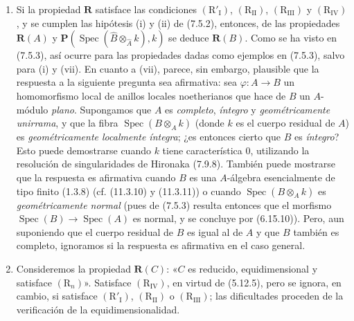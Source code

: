\begin{remarks}[7.5.4]
\begin{enumerate}
\item[(iii)] Si la propiedad $\boldsymbol R$ satisface las
condiciones $(\mathrm R'_{\mathrm I})$, $(\mathrm R_{\mathrm{II}})$,
$(\mathrm R_{\mathrm{III}})$ y $(\mathrm R_{\mathrm{IV}})$, y se
cumplen las hipótesis (i) y (ii) de (7.5.2), entonces, de las
propiedades $\boldsymbol R(A)$ y
$\boldsymbol P(\operatorname{Spec}(\widehat B
\otimes_{\widehat A}k),k)$
se deduce $\boldsymbol R(B)$. Como se ha visto en (7.5.3), así ocurre para
las propiedades dadas como ejemplos en (7.5.3), salvo para (i) y (vii).
En cuanto a (vii), parece, sin embargo, plausible que la respuesta a la
siguiente pregunta sea afirmativa: sea $\varphi:A\to B$ un
homomorfismo local de anillos locales noetherianos que hace de $B$ un
$A$-módulo \emph{plano}. Supongamos que $A$ es \emph{completo}, \emph{íntegro} y
\emph{geométricamente unirrama}, y que la fibra
$\operatorname{Spec}(B\otimes_A k)$ (donde $k$ es el cuerpo residual
de $A$) es \emph{geométricamente localmente íntegra}; ¿es entonces cierto
que $B$ es \emph{íntegro}? Esto puede demostrarse cuando $k$ tiene
característica 0, utilizando la resolución de singularidades de
Hironaka (7.9.8). También puede mostrarse que la respuesta es
afirmativa cuando $B$ es una $A$-álgebra esencialmente de tipo finito
(1.3.8) (cf. (11.3.10) y (11.3.11)) o cuando
$\operatorname{Spec}(B\otimes_A k)$ es \emph{geométricamente normal}
(pues de (7.5.3) resulta entonces que el morfismo
$\operatorname{Spec}(B)\to\operatorname{Spec}(A)$ es normal, y se
concluye por (6.15.10)). Pero, aun suponiendo que el cuerpo residual de
$B$ es igual al de $A$ y que $B$ también es completo, ignoramos si la
respuesta es afirmativa en el caso general.

\item[(iv)] Consideremos la propiedad $\boldsymbol R(C)$:
«$C$ es reducido, equidimensional y satisface $(\mathrm R_n)$».
Satisface $(\mathrm R_{\mathrm{IV}})$, en virtud de (5.12.5), pero
se ignora, en cambio, si satisface $(\mathrm R'_{\mathrm I})$,
$(\mathrm R_{\mathrm{II}})$ o $(\mathrm R_{\mathrm{III}})$; las
dificultades proceden de la verificación de la equidimensionalidad.
\end{enumerate}
\end{remarks}
